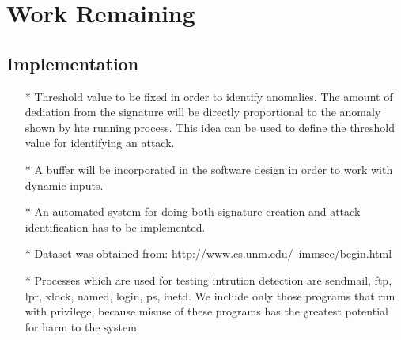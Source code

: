 \section{Work Remaining}

\subsection{Implementation}

\begin{itemize}
    \item[*] Threshold value to be fixed in order to identify anomalies. The amount of dediation from the signature will be directly proportional to the anomaly shown by hte running process. This idea can be used to define the threshold value for identifying an attack.
    \item[*] A buffer will be incorporated in the software design in order to work with dynamic inputs.
    \item[*] An automated system for doing both signature creation and attack identification has to be implemented.
    \item[*] Dataset was obtained from: http://www.cs.unm.edu/~immsec/begin.html
    \item[*] Processes which are used for testing intrution detection are sendmail, ftp, lpr, xlock, named, login, ps, inetd. We include only those programs that run with privilege, because misuse of these programs has the greatest potential for harm to the system. 
\end{itemize}
